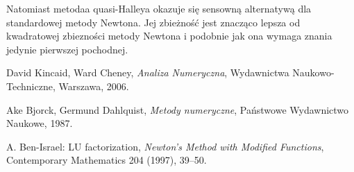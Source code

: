 \documentclass{article}
\begin{document}
    Natomiast metodaa quasi-Halleya okazuje się sensowną alternatywą dla standardowej
    metody Newtona. Jej zbieżność jest znacząco lepsza od kwadratowej zbiezności
    metody Newtona i podobnie jak ona wymaga znania jedynie pierwszej pochodnej.
    \begin{thebibliography}{9}
        David Kincaid, Ward Cheney,
        \textit{Analiza Numeryczna},
        Wydawnictwa Naukowo-Techniczne, Warszawa, 2006.

        Ake Bjorck, Germund Dahlquist,
        \textit{Metody numeryczne},
        Państwowe Wydawnictwo Naukowe, 1987.

        A. Ben-Israel:  LU factorization,
        \textit{Newton’s Method with Modified Functions},
        Contemporary Mathematics 204 (1997), 39–50.
    \end{thebibliography}
\end{document}
